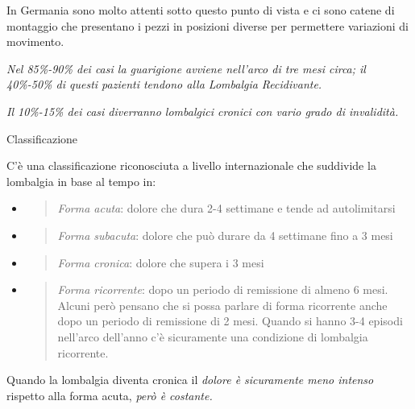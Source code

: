 \documentclass[]{article}
\begin{document}
In Germania sono molto attenti sotto questo punto di vista e ci sono
catene di montaggio che presentano i pezzi in posizioni diverse per
permettere variazioni di movimento.

\emph{Nel 85\%-90\% dei casi la guarigione avviene nell'arco di tre mesi
circa; il 40\%-50\% di questi pazienti tendono alla Lombalgia
Recidivante. }

\emph{Il 10\%-15\% dei casi diverranno lombalgici cronici con vario
grado di invalidità.}

Classificazione

C'è una classificazione riconosciuta a livello internazionale che
suddivide la lombalgia in base al tempo in:

\begin{itemize}
\item
  \begin{quote}
  \emph{Forma acuta}: dolore che dura 2-4 settimane e tende ad
  autolimitarsi
  \end{quote}
\end{itemize}

\begin{itemize}
\item
  \begin{quote}
  \emph{Forma subacuta}: dolore che può durare da 4 settimane fino a 3
  mesi
  \end{quote}
\end{itemize}

\begin{itemize}
\item
  \begin{quote}
  \emph{Forma cronica}: dolore che supera i 3 mesi
  \end{quote}
\end{itemize}

\begin{itemize}
\item
  \begin{quote}
  \emph{Forma ricorrente}: dopo un periodo di remissione di almeno 6
  mesi. Alcuni però pensano che si possa parlare di forma ricorrente
  anche dopo un periodo di remissione di 2 mesi. Quando si hanno 3-4
  episodi nell'arco dell'anno c'è sicuramente una condizione di
  lombalgia ricorrente.
  \end{quote}
\end{itemize}

Quando la lombalgia diventa cronica il \emph{dolore è sicuramente meno
intenso} rispetto alla forma acuta, \emph{però è costante.}
\end{document}
